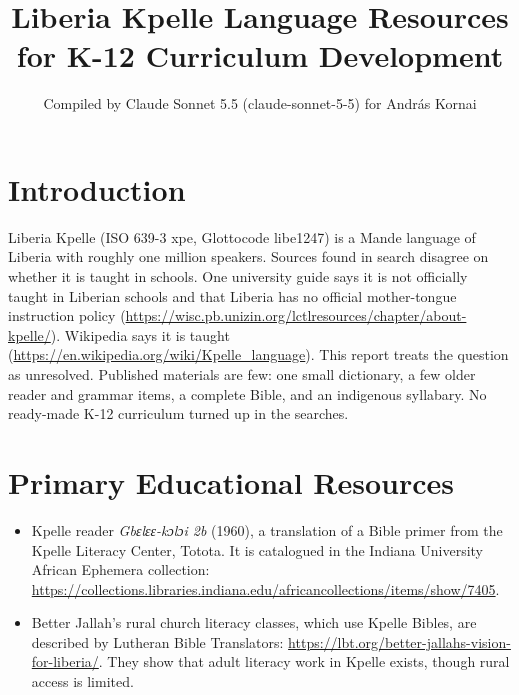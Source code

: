 \documentclass[12pt]{article}
\title{Liberia Kpelle Language Resources for K-12 Curriculum Development}
\author{Compiled by Claude Sonnet 5.5 (claude-sonnet-5-5) for Andr\'as Kornai}
\date{}
\begin{document}
\maketitle

\section{Introduction}
Liberia Kpelle (ISO 639-3 xpe, Glottocode libe1247) is a Mande language of Liberia with roughly one million speakers. Sources found in search disagree on whether it is taught in schools. One university guide says it is not officially taught in Liberian schools and that Liberia has no official mother-tongue instruction policy (\url{https://wisc.pb.unizin.org/lctlresources/chapter/about-kpelle/}). Wikipedia says it is taught (\url{https://en.wikipedia.org/wiki/Kpelle_language}). This report treats the question as unresolved. Published materials are few: one small dictionary, a few older reader and grammar items, a complete Bible, and an indigenous syllabary. No ready-made K-12 curriculum turned up in the searches.

\section{Primary Educational Resources}
\begin{itemize}
\item Kpelle reader \emph{Gbɛlɛɛ-kɔlɔi 2b} (1960), a translation of a Bible primer from the Kpelle Literacy Center, Totota. It is catalogued in the Indiana University African Ephemera collection: \url{https://collections.libraries.indiana.edu/africancollections/items/show/7405}.
\item Better Jallah's rural church literacy classes, which use Kpelle Bibles, are described by Lutheran Bible Translators: \url{https://lbt.org/better-jallahs-vision-for-liberia/}. They show that adult literacy work in Kpelle exists, though rural access is limited.
\end{itemize}
\end{document}
